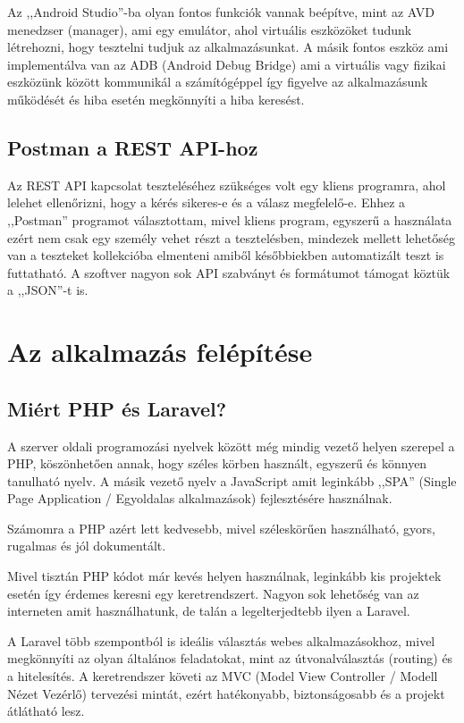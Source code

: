 \documentclass[
]{thesis-ekf}
\theoremstyle{definition}
\theoremstyle{remark}
\begin{document}
Az ,,Android Studio''-ba olyan fontos funkciók vannak beépítve, mint az AVD menedzser (manager), ami egy emulátor, ahol virtuális eszközöket tudunk létrehozni, hogy tesztelni tudjuk az alkalmazásunkat. A másik fontos eszköz ami implementálva van az ADB (Android Debug Bridge) ami a virtuális vagy fizikai eszközünk között kommunikál a számítógéppel így figyelve az alkalmazásunk működését és hiba esetén megkönnyíti a hiba keresést. 
\section{Postman a REST API-hoz}
Az REST API kapcsolat teszteléséhez szükséges volt egy kliens programra, ahol lelehet ellenőrizni, hogy a kérés sikeres-e és a válasz megfelelő-e. Ehhez a ,,Postman'' programot választottam, mivel kliens program, egyszerű a használata ezért nem csak egy személy vehet részt a tesztelésben, mindezek mellett lehetőség van a teszteket kollekcióba elmenteni amiből későbbiekben automatizált teszt is futtatható. A szoftver nagyon sok API szabványt és formátumot támogat köztük a ,,JSON''-t is.

\chapter{Az alkalmazás felépítése}
\section{Miért PHP és Laravel?}
A szerver oldali programozási nyelvek között még mindig vezető helyen szerepel a PHP, köszönhetően annak, hogy széles körben használt, egyszerű és könnyen tanulható nyelv. A másik vezető nyelv a JavaScript amit leginkább ,,SPA'' (Single Page Application / Egyoldalas alkalmazások) fejlesztésére használnak. 

Számomra a PHP azért lett kedvesebb, mivel széleskörűen használható, gyors, rugalmas és jól dokumentált. 

Mivel tisztán PHP kódot már kevés helyen használnak, leginkább kis projektek esetén így érdemes keresni egy keretrendszert. Nagyon sok lehetőség van az interneten amit használhatunk, de talán a legelterjedtebb ilyen a Laravel. 

A Laravel több szempontból is ideális választás webes alkalmazásokhoz, mivel megkönnyíti az olyan általános feladatokat, mint az útvonalválasztás (routing) és a hitelesítés. A keretrendszer követi az MVC (Model View Controller / Modell Nézet Vezérlő) tervezési mintát, ezért hatékonyabb, biztonságosabb és a projekt átlátható lesz. 
\end{document}
